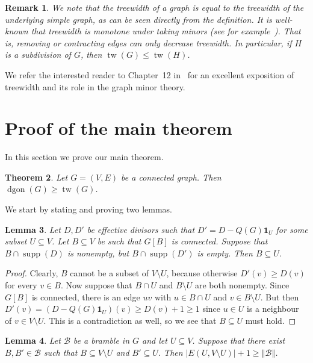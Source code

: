 \documentclass[10pt]{amsart}
\newtheorem{theorem}{Theorem}[section]
\newtheorem{lemma}[theorem]{Lemma}
\newtheorem{rema}[theorem]{Remark}
\newcommand{\one}{\ensuremath{\mathbf{1}}}
\DeclareMathOperator{\tw}{tw}
\DeclareMathOperator{\dgon}{dgon}
\DeclareMathOperator{\supp}{supp}
\newcommand*{\B}{\mathcal{B}}
\newcommand*{\order}[1]{\left\Vert#1\right\Vert}
\begin{document}
\begin{rema}
We note that the treewidth of a graph is equal to the treewidth of the underlying simple graph, as can be seen directly from the definition. It is well-known that treewidth is monotone under taking minors (see for example~\cite{DiestelGraphTheory}). That is, removing or contracting edges can only decrease treewidth. In particular, if $H$ is a subdivision of $G$, then $\tw(G)\leq \tw(H)$. 


\end{rema}
We refer the interested reader to Chapter~12 in~\cite{DiestelGraphTheory} for an excellent exposition of treewidth and its role in the graph minor theory.

\section{Proof of the main theorem}
In this section we prove our main theorem.
\begin{theorem}\label{main}
Let $G=(V,E)$ be a connected graph. Then $\dgon(G)\geq \tw(G)$.
\end{theorem} 

We start by stating and proving two lemmas.
\begin{lemma}\label{oneside}
Let $D,D'$ be effective divisors such that $D'=D-Q(G)\one_U$ for some subset $U\subseteq V$. Let $B\subseteq V$ be such that $G[B]$ is connected. Suppose that $B\cap \supp(D)$ is nonempty, but $B\cap \supp(D')$ is empty. Then $B\subseteq U$.
\end{lemma}
\begin{proof}
Clearly, $B$ cannot be a subset of $V\setminus U$, because otherwise $D'(v)\geq D(v)$ for every $v\in B$. Now suppose that $B\cap U$ and $B\setminus U$ are both nonempty. Since $G[B]$ is connected, there is an edge $uv$ with $u\in B\cap U$ and $v\in B\setminus U$. But then $D'(v)=(D-Q(G)\one_U)(v)\geq D(v)+1\geq 1$ since $u\in U$ is a neighbour of $v\in V\setminus U$. This is a contradiction as well, so we see that $B\subseteq U$ must hold.
\end{proof}

\begin{lemma}\label{brambleseparation}
Let $\B$ be a bramble in $G$ and let $U\subseteq V$. Suppose that there exist $B,B'\in \B$ such that $B\subseteq V\setminus U$ and $B'\subseteq U$. Then $|E(U,V\setminus U)|+1\geq \order{\B}$.
\end{lemma}
\end{document}
